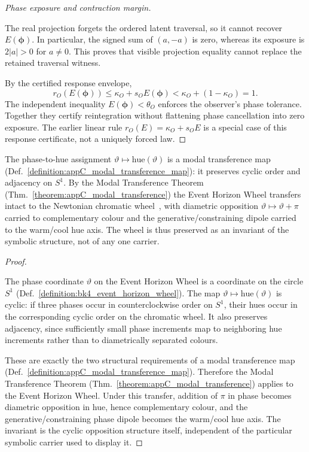 \begin{proof}[Phase exposure and contraction margin]
\label{proof:bk4_imagination_bridges_wheel}
\leavevmode

The real projection forgets the ordered latent traversal, so it cannot recover
\(E(\mathbf{\phi})\).  In particular, the signed sum of \((a,-a)\) is zero,
whereas its exposure is \(2|a|>0\) for \(a\ne0\).  This proves that visible
projection equality cannot replace the retained traversal witness.

By the certified response envelope,
\[
 r_O(E(\mathbf{\phi}))
 \le \kappa_O+s_OE(\mathbf{\phi})
 < \kappa_O+(1-\kappa_O)=1.
\]
The independent inequality \(E(\mathbf{\phi})<\theta_O\) enforces the
observer's phase tolerance.  Together they certify reintegration without
flattening phase cancellation into zero exposure.  The earlier linear rule
\(r_O(E)=\kappa_O+s_OE\) is a special case of this response certificate, not a
uniquely forced law.
\end{proof}

\begin{corollary}
\label{corollary:bk4_chromatic_transference_of_wheel}
The phase-to-hue assignment $\vartheta\mapsto\mathrm{hue}(\vartheta)$ is a modal
transference map (Def.~\ref{definition:appC_modal_transference_map}): it preserves
cyclic order and adjacency on $S^1$. By the Modal Transference Theorem
(Thm.~\ref{theorem:appC_modal_transference}) the Event Horizon Wheel transfers
intact to the Newtonian chromatic wheel~\cite{newton1704opticks}, with diametric opposition
$\vartheta\mapsto\vartheta+\pi$ carried to complementary colour and the
generative/constraining dipole carried to the warm/cool hue axis. The wheel is thus
preserved as an invariant of the symbolic structure, not of any one carrier.
\end{corollary}

\begin{proof}
\label{proof:bk4_chromatic_transference_of_wheel}
\leavevmode

The phase coordinate $\vartheta$ on the Event Horizon Wheel is a coordinate on
the circle $S^1$ (Def.~\ref{definition:bk4_event_horizon_wheel}). The map
$\vartheta\mapsto\mathrm{hue}(\vartheta)$ is cyclic: if three phases occur in
counterclockwise order on $S^1$, their hues occur in the corresponding cyclic
order on the chromatic wheel. It also preserves adjacency, since sufficiently
small phase increments map to neighboring hue increments rather than to
diametrically separated colours.

These are exactly the two structural requirements of a modal transference map
(Def.~\ref{definition:appC_modal_transference_map}). Therefore the Modal
Transference Theorem (Thm.~\ref{theorem:appC_modal_transference}) applies to
the Event Horizon Wheel. Under this transfer, addition of $\pi$ in phase becomes
diametric opposition in hue, hence complementary colour, and the
generative/constraining phase dipole becomes the warm/cool hue axis. The
invariant is the cyclic opposition structure itself, independent of the
particular symbolic carrier used to display it.
\end{proof}

